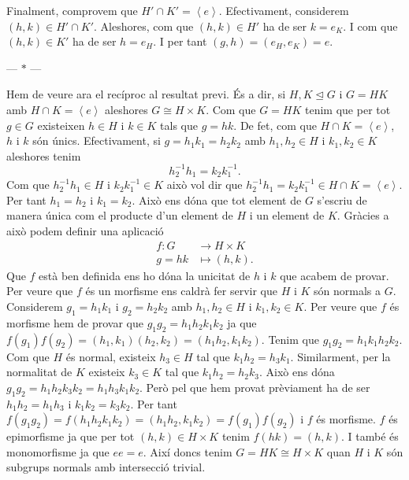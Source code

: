 \documentclass[12pt]{article}
\newcommand{\gen}[1]{\left\langle #1 \right\rangle}
\newcommand{\normal}{\trianglelefteq}
\newcommand{\parbreak}{
	\begin{center}
		--- $\ast$ ---
	\end{center} 
}
\begin{document}
Finalment, comprovem que \( H' \cap K' = \gen{e} \). Efectivament, considerem \( (h,k) \in H' \cap K' \). Aleshores, com que \( (h,k) \in H' \) ha de ser \( k = e_K \). I com que \( (h,k) \in K' \) ha de ser \( h = e_H \). I per tant \( (g,h) = (e_H, e_K) = e \).

\parbreak

Hem de veure ara el recíproc al resultat previ. És a dir, si \( H,K \normal G \) i \( G = HK \) amb \( H \cap K = \gen{e} \) aleshores \( G \cong H \times K \). Com que \( G = HK \) tenim que per tot \( g \in G \) existeixen \( h\in H \) i \( k \in K \) tals que \( g= hk \). De fet, com que \( H \cap K = \gen{e} \), \( h \) i \( k \) són únics. Efectivament, si \( g = h_1k_1 = h_2k_2 \) amb \( h_1,h_2 \in H \) i \( k_1,k_2 \in K \) aleshores tenim  
\begin{equation*}
	h_2^{-1}h_1 = k_2k_1^{-1}.
\end{equation*}
Com que \( h_2^{-1}h_1 \in H \) i \( k_2k_1^{-1} \in K \) això vol dir que \( h_2^{-1}h_1 = k_2k_1^{-1} \in H \cap K = \gen{e} \). Per tant \( h_1 = h_2 \) i \( k_1 = k_2 \). Això ens dóna que tot element de \( G \) s'escriu de manera única com el producte d'un element de \( H \) i un element de \( K \). Gràcies a això podem definir una aplicació 
\begin{align*}
	f \colon G & \longrightarrow H \times K \\
	g = hk & \longmapsto (h,k).
\end{align*}
Que \( f \) està ben definida ens ho dóna la unicitat de \( h \) i \( k \) que acabem de provar. Per veure que \( f \) és un morfisme ens caldrà fer servir que \( H \) i \( K \) són normals a \( G \). Considerem \( g_1 = h_1k_1 \) i \( g_2 = h_2k_2 \) amb \( h_1,h_2 \in H \) i \( k_1,k_2 \in K \). Per veure que \( f \) és morfisme hem de provar que \( g_1g_2 = h_1h_2k_1k_2 \) ja que \( f(g_1)f(g_2) = (h_1,k_1)(h_2,k_2) = (h_1h_2,k_1k_2) \). Tenim que \( g_1g_2 = h_1k_1h_2k_2 \). Com que \( H \) és normal, existeix \( h_3 \in H \) tal que \( k_1h_2 = h_3k_1 \). Similarment, per la normalitat de \( K \) existeix \( k_3 \in K \) tal que \( k_1h_2 = h_2k_3 \). Això ens dóna \( g_1g_2 = h_1h_2k_3k_2 = h_1h_3k_1k_2 \). Però pel que hem provat prèviament ha de ser \( h_1h_2 = h_1h_3 \) i \( k_1k_2 = k_3k_2 \). Per tant \( f(g_1g_2) = f(h_1h_2k_1k_2) = (h_1h_2,k_1k_2) = f(g_1)f(g_2) \) i \( f \) és morfisme. \( f \) és epimorfisme ja que per tot \( (h,k) \in H \times K \) tenim \( f(hk) = (h,k) \). I també és monomorfisme ja que \( ee = e \). Així doncs tenim \( G = HK \cong H \times K \) quan \( H \) i \( K \) són subgrups normals amb intersecció trivial.
\end{document}
